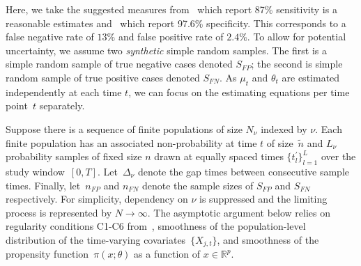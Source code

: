 \documentclass[11pt]{amsart}
\numberwithin{equation}{section}
\theoremstyle{plain}
\begin{document}

Here, we take the suggested measures from~\cite{Arevalo2020} which report 87\% sensitivity is a reasonable estimates and~\cite{Cohen2020} which report 97.6\% specificity.  This corresponds to a false negative rate of $13\%$ and false positive rate of $2.4\%$.  To allow for potential uncertainty, we assume two \emph{synthetic} simple random samples.  The first is a simple random sample of true negative cases denoted $S_{FP}$; the second is simple random sample of true positive cases denoted $S_{FN}$.  As $\mu_t$ and $\theta_{t}$ are estimated independently at each time $t$, we can focus on the estimating equations per time point~$t$ separately.

Suppose there is a sequence of finite populations of size $N_{\nu}$ indexed by $\nu$.  Each finite population has an associated non-probability at time $t$ of  size~$\tilde n$ and $L_\nu$ probability samples of fixed size $n$ drawn at equally spaced times $\{ t^\prime_l \}_{l=1}^L$ over the study window~$[0,T]$. Let~$\Delta_\nu$ denote the gap times between consecutive sample times. Finally, let~$n_{FP}$ and $n_{FN}$ denote the sample sizes of $S_{FP}$ and $S_{FN}$ respectively.  For simplicity, dependency on $\nu$ is suppressed and the limiting process is represented by $N \to \infty$. The asymptotic argument below relies on regularity conditions C1-C6 from~\cite{Chen2019}, smoothness of the population-level distribution of the time-varying covariates~$\{ X_{j,t} \}$, and smoothness of the propensity function~$\pi(x; \theta)$ as a function of $x \in \mathbb{R}^p$.
\end{document}
